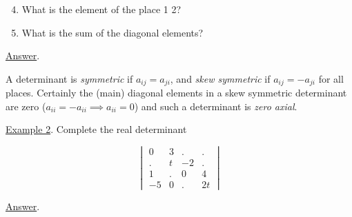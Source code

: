 \documentclass[11pt]{amsbook}
\begin{document}
    \renewcommand{\labelenumi}{\alph{enumi})}
    \begin{enumerate}
    \setcounter{enumi}{3}
        \item What is the element of the place 1 2?
        \item What is the sum of the diagonal elements?
    \end{enumerate}
    
    \underline{Answer}.

    \begin{multienumerate}
      \setcounter{enumi}{0}
      \renewcommand{\labelenumi}
      {\addtocounter{enumi}{1}\alph{enumi})}
    \end{multienumerate}

    
    A determinant is \emph{symmetric} if $a_{ij} = a_{ji}$, and \emph{skew symmetric} if $a_{ij} = -a_{ji}$ for all places. Certainly the (main) diagonal  elements in a skew symmetric determinant are zero ($a_{ii} = -a_{ii} \implies a_{ii} = 0$) and such a determinant is \emph{zero axial}.
    
    \underline{Example 2}. Complete the real determinant

    \[
    \begin{vmatrix} 
        0 & 3 & . & . \\ 
        . & t & -2 & . \\ 
        1 & . & 0 & 4 \\ 
        -5 & 0 & . & 2t  
    \end{vmatrix}
    \]

    \begin{multienumerate}
      \setcounter{enumi}{0}
      \renewcommand{\labelenumi}
      {\addtocounter{enumi}{1}\alph{enumi})}
    \end{multienumerate}
    
    \underline{Answer}.
    
    \begin{multienumerate}
      \setcounter{enumi}{0}
      \renewcommand{\labelenumi}
      {\addtocounter{enumi}{1}\alph{enumi})}
    \end{multienumerate}
\end{document}
